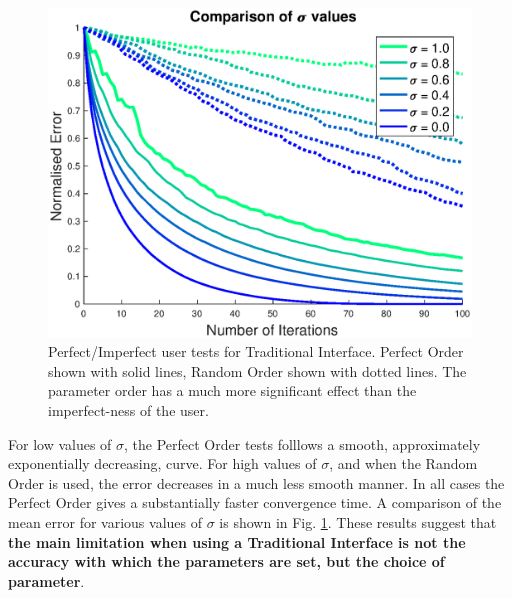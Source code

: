 \documentclass[11pt, oneside]{report}   	%
\begin{document}
\begin{figure}[h]
	\centering
	\includegraphics[width = 5in]{TradInterfaceTests2.eps}
	\caption{Perfect/Imperfect user tests for Traditional Interface. Perfect Order shown with solid lines, Random Order shown with dotted lines. The parameter order has a much more significant effect than the imperfect-ness of the user.}
	\label{fig:TradTest2}
		\vspace{-10pt}
\end{figure}
For low values of $\sigma$, the Perfect Order tests folllows a smooth, approximately exponentially decreasing, curve. For high values of $\sigma$, and when the Random Order is used, the error decreases in a much less smooth manner. In all cases the Perfect Order gives a substantially faster convergence time. A comparison of the mean error for various values of $\sigma$ is shown in Fig. \ref{fig:TradTest2}. These results suggest that \textbf{the main limitation when using a Traditional Interface is not the accuracy with which the parameters are set, but the choice of parameter}.

%
\end{document}
